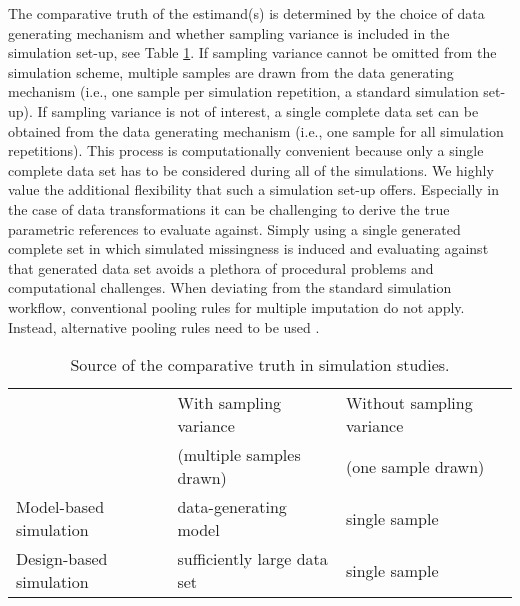 \documentclass[bimj,fleqn]{w-art}
\begin{document}
The comparative truth of the estimand(s) is determined by the choice of data generating mechanism and whether sampling variance is included in the simulation set-up, see Table \ref{table:dgm_truth}. If sampling variance cannot be omitted from the simulation scheme, multiple samples are drawn from the data generating mechanism (i.e., one sample per simulation repetition, a standard simulation set-up). If sampling variance is not of interest, a single complete data set can be obtained from the data generating mechanism (i.e., one sample for all simulation repetitions). This process is computationally convenient because only a single complete data set has to be considered during all of the simulations. We highly value the additional flexibility that such a simulation set-up offers. Especially in the case of data transformations it can be challenging to derive the true parametric references to evaluate against. Simply using a single generated complete set in which simulated missingness is induced and evaluating against that generated data set avoids a plethora of procedural problems and computational challenges.
When deviating from the standard simulation workflow, conventional pooling rules for multiple imputation \citep[cf.][p. 76-77]{rubi87} do not apply. Instead, alternative pooling rules need to be used \citep{raghunathan2003multiple,vink14}.


\begin{table}[htb]
\begin{center}
\caption{Source of the comparative truth in simulation studies.}
\label{table:dgm_truth}
\begin{tabular}{lll}
\hline
               & With sampling variance      & Without sampling variance \\
               & (multiple samples drawn)    & (one sample drawn) \\
\hline  
Model-based simulation   & data-generating model         & single sample \\
Design-based simulation  & sufficiently large data set   & single sample \\
\hline
\end{tabular}
\end{center}
\end{table}


\end{document}
